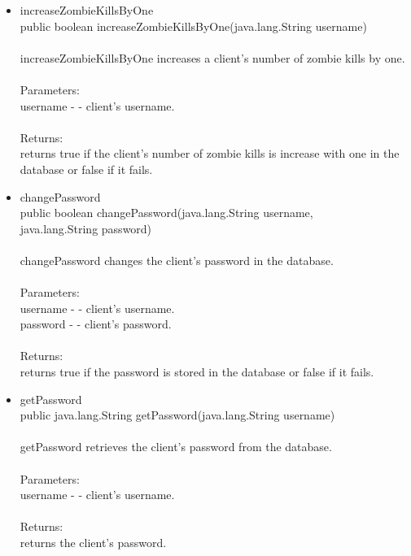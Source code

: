 \documentclass[letterpaper]{article}
\begin{document}
\begin{itemize}
\begin{itemize}
													\item	increaseZombieKillsByOne \\
															public boolean increaseZombieKillsByOne(java.lang.String username) \\ \\
															increaseZombieKillsByOne increases a client's number of zombie kills by one. \\ \\
															Parameters: \\
															username - - client's username. \\ \\
															Returns: \\
															returns true if the client's number of zombie kills is increase with one in the database or false if it fails.
													\item	changePassword \\
															public boolean changePassword(java.lang.String username, \\
						                     java.lang.String password) \\ \\
															changePassword changes the client's password in the database. \\ \\
															Parameters: \\
															username - - client's username. \\
															password - - client's password. \\ \\
															Returns: \\
															returns true if the password is stored in the database or false if it fails.
													\item	getPassword \\
															public java.lang.String getPassword(java.lang.String username) \\ \\
															getPassword retrieves the client's password from the database. \\ \\
															Parameters: \\
															username - - client's username. \\ \\
															Returns: \\
															returns the client's password.

\end{itemize}
\end{itemize}
\end{document}
